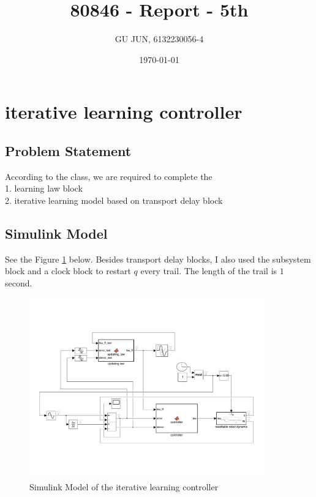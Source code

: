 \documentclass{article}
\title{80846 - Report - 5th}
\author{GU JUN, 6132230056-4}
\date{\today}
\begin{document}
\maketitle


\section{\centering \Large iterative learning controller}

\subsection*{Problem Statement}

According to the class, we are required to complete the \\
1. learning law block \\
2. iterative learning model based on transport delay block \\


\subsection{Simulink Model}
See the Figure \ref{fig:model_ilc} below. Besides transport delay blocks, I also used the subsystem block and a clock block to restart $q$ every trail. The length of the trail is $1$ second.
\begin{figure}[ht]
    \centering
    \includegraphics[width=0.9\textwidth]{report/figures/model_ilc.pdf}
    \caption{Simulink Model of the iterative learning controller}
    \label{fig:model_ilc}
\end{figure}
\end{document}
